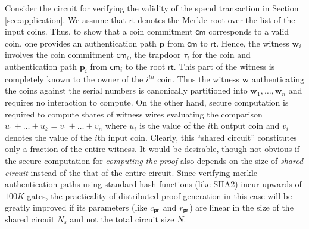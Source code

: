 Consider the circuit for verifying the validity of the spend transaction in Section \ref{sec:application}. We assume that $\mathsf{rt}$ denotes the Merkle
root over the list of the input coins. Thus, to show that a coin commitment $\mathsf{cm}$ corresponds to a valid coin, one provides an authentication path $\bm{p}$ from $\mathsf{cm}$ to $\mathsf{rt}$. Hence, the witness $\bm{w}_i$ involves the coin commitment $\mathsf{cm}_i$, the trapdoor $\tau_i$ for the coin and authentication path $\bm{p}_i$ from $\mathsf{cm}_i$ to the root $\mathsf{rt}$. This part of the witness is completely known to the owner of the $i^{th}$ coin. Thus the witness $\bm{w}$ authenticating the coins against the serial numbers is canonically partitioned into $\bm{w}_1,\ldots,\bm{w}_n$
and requires no interaction to compute. On the other hand, secure computation is required to compute shares of witness wires evaluating the comparison $u_1+\ldots+u_k = v_1+\ldots+v_n$ where $u_i$ is the value of the $i$th output coin and $v_i$ denotes the value of the $i$th input coin. Clearly, this ``shared circuit'' 
constitutes only a fraction of the entire witness. It would be desirable, though not obvious if the secure computation for {\em computing the proof} 
also depends on the size of {\em shared circuit} instead of the that of the entire circuit. Since verifying merkle authentication paths using 
standard hash functions (like SHA2) incur upwards of $100K$ gates, the practicality of distributed proof generation in this case will be
greatly improved if its parameters (like $c_\mathsf{pr}$ and $r_\mathsf{pr}$) are 
linear in the size of the shared circuit $N_s$ and not the total circuit size $N$.
